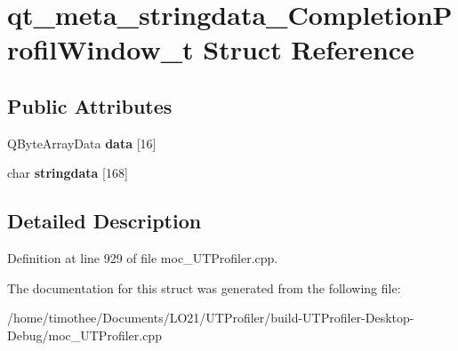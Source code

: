 \hypertarget{structqt__meta__stringdata___completion_profil_window__t}{\section{qt\-\_\-meta\-\_\-stringdata\-\_\-\-Completion\-Profil\-Window\-\_\-t Struct Reference}
\label{structqt__meta__stringdata___completion_profil_window__t}
}
\subsection*{Public Attributes}
\begin{DoxyCompactItemize}
\item 
\hypertarget{structqt__meta__stringdata___completion_profil_window__t_af7077185398b681ff57b1906f979b24a}{Q\-Byte\-Array\-Data {\bfseries data} \mbox{[}16\mbox{]}}\label{structqt__meta__stringdata___completion_profil_window__t_af7077185398b681ff57b1906f979b24a}

\item 
\hypertarget{structqt__meta__stringdata___completion_profil_window__t_a943885b68fdb9fc1a159a4aab0706282}{char {\bfseries stringdata} \mbox{[}168\mbox{]}}\label{structqt__meta__stringdata___completion_profil_window__t_a943885b68fdb9fc1a159a4aab0706282}

\end{DoxyCompactItemize}


\subsection{Detailed Description}


Definition at line 929 of file moc\-\_\-\-U\-T\-Profiler.\-cpp.



The documentation for this struct was generated from the following file\-:\begin{DoxyCompactItemize}
\item 
/home/timothee/\-Documents/\-L\-O21/\-U\-T\-Profiler/build-\/\-U\-T\-Profiler-\/\-Desktop-\/\-Debug/moc\-\_\-\-U\-T\-Profiler.\-cpp\end{DoxyCompactItemize}
